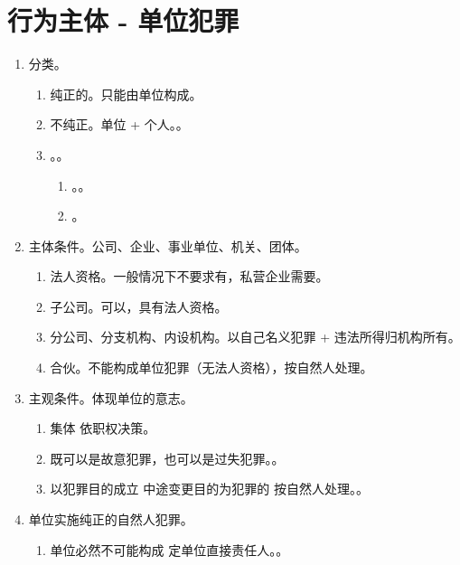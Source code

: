 \section{行为主体 - 单位犯罪}
\begin{enumerate}
  \item 分类。
        \begin{enumerate}
          \item 纯正的。只能由单位构成。
          \item 不纯正。单位 + 个人。。
          \item {}。。
                \begin{enumerate}
                  \item {}。。
                  \item {}。
                \end{enumerate}
        \end{enumerate}
  \item 主体条件。公司、企业、事业单位、机关、团体。
        \begin{enumerate}
          \item 法人资格。一般情况下不要求有，私营企业需要。
          \item 子公司。可以，具有法人资格。
          \item 分公司、分支机构、内设机构。以自己名义犯罪 + 违法所得归机构所有。
          \item 合伙。不能构成单位犯罪（无法人资格），按自然人处理。
        \end{enumerate}
  \item 主观条件。体现单位的意志。
        \begin{enumerate}
          \item 集体 \hz 依职权决策。
          \item 既可以是故意犯罪，也可以是过失犯罪。。
          \item 以犯罪目的成立 \hz 中途变更目的为犯罪的 \yjt 按自然人处理。。
        \end{enumerate}
  \item 单位实施纯正的自然人犯罪。
        \begin{enumerate}
          \item 单位必然不可能构成 \yjt 定单位直接责任人。。

\end{enumerate}
\end{enumerate}
